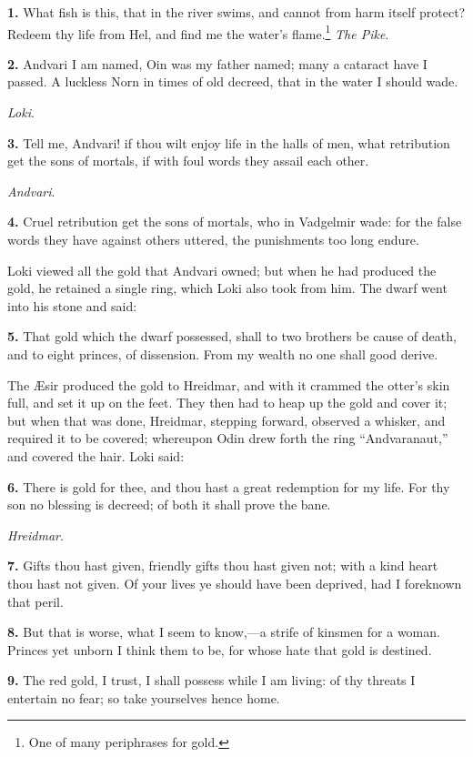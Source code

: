 \textbf{1.} What fish is this, that in the river swims, and cannot from harm
itself protect? Redeem thy life from Hel, and find me the water's
flame.\footnote{One of many periphrases for gold.} \emph{The Pike}.

\textbf{2.} Andvari I am named, Oin was my father named; many a cataract have
I passed. A luckless Norn in times of old decreed, that in the water I
should wade.

\emph{Loki}.

\textbf{3.} Tell me, Andvari! if thou wilt enjoy life in the halls of men,
what retribution get the sons of mortals, if with foul words they
assail each other.

\emph{Andvari}.

\textbf{4.} Cruel retribution get the sons of mortals, who in Vadgelmir wade:
for the false words they have against others uttered, the punishments
too long endure.

Loki viewed all the gold that Andvari owned; but when he had produced
the gold, he retained a single ring, which Loki also took from him.
The dwarf went into his stone and said:

\textbf{5.} That gold which the dwarf possessed, shall to two brothers be
cause of death, and to eight princes, of dissension. From my wealth no
one shall good derive.

The Æsir produced the gold to Hreidmar, and with it crammed the
otter's skin full, and set it up on the feet. They then had to heap up
the gold and cover it; but when that was done, Hreidmar, stepping
forward, observed a whisker, and required it to be covered; whereupon
Odin drew forth the ring ``Andvaranaut,'' and covered the hair. Loki
said:

\textbf{6.} There is gold for thee, and thou hast a great redemption for my
life. For thy son no blessing is decreed; of both it shall prove the
bane.

\emph{Hreidmar}.

\textbf{7.} Gifts thou hast given, friendly gifts thou hast given not; with a
kind heart thou hast not given. Of your lives ye should have been
deprived, had I foreknown that peril.

\textbf{8.} But that is worse, what I seem to know,—a strife of kinsmen for
a woman. Princes yet unborn I think them to be, for whose hate that
gold is destined.

\textbf{9.} The red gold, I trust, I shall possess while I am living: of thy
threats I entertain no fear; so take yourselves hence home.

